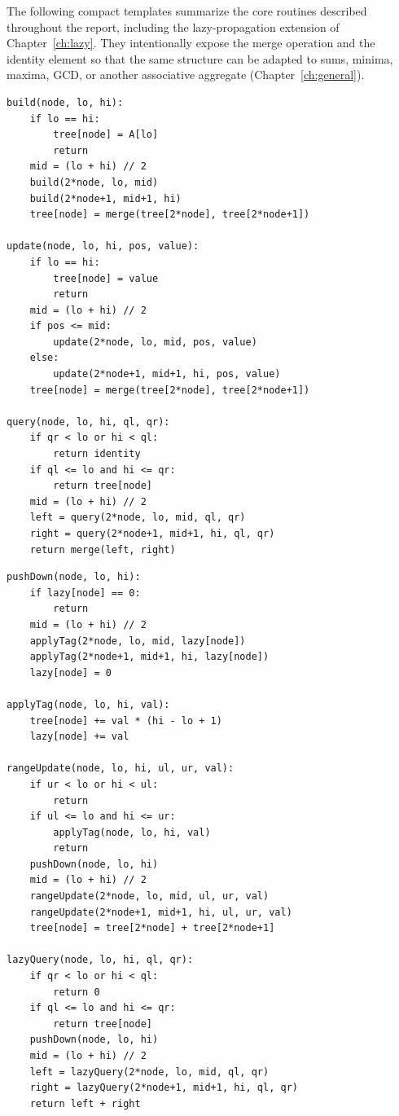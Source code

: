 \documentclass[
  11pt,
  a4paper,
  twoside=false,
  numbers=noenddot,
  headings=big,
  parskip=half,
  toc=bibliography,
  toc=listof,
  bibliography=totoc
]{scrreprt}
\begin{document}
The following compact templates summarize the core routines described throughout the report, including the lazy-propagation extension of Chapter~\ref{ch:lazy}. They intentionally expose the merge operation and the identity element so that the same structure can be adapted to sums, minima, maxima, GCD, or another associative aggregate (Chapter~\ref{ch:general}).

\begin{lstlisting}[caption={Core build, point-update, and range-query routines (no lazy propagation).}]
build(node, lo, hi):
    if lo == hi:
        tree[node] = A[lo]
        return
    mid = (lo + hi) // 2
    build(2*node, lo, mid)
    build(2*node+1, mid+1, hi)
    tree[node] = merge(tree[2*node], tree[2*node+1])

update(node, lo, hi, pos, value):
    if lo == hi:
        tree[node] = value
        return
    mid = (lo + hi) // 2
    if pos <= mid:
        update(2*node, lo, mid, pos, value)
    else:
        update(2*node+1, mid+1, hi, pos, value)
    tree[node] = merge(tree[2*node], tree[2*node+1])

query(node, lo, hi, ql, qr):
    if qr < lo or hi < ql:
        return identity
    if ql <= lo and hi <= qr:
        return tree[node]
    mid = (lo + hi) // 2
    left = query(2*node, lo, mid, ql, qr)
    right = query(2*node+1, mid+1, hi, ql, qr)
    return merge(left, right)
\end{lstlisting}

\begin{lstlisting}[caption={Lazy-propagation extension for range-add / range-sum (Chapter~\ref{ch:lazy}).}]
pushDown(node, lo, hi):
    if lazy[node] == 0:
        return
    mid = (lo + hi) // 2
    applyTag(2*node, lo, mid, lazy[node])
    applyTag(2*node+1, mid+1, hi, lazy[node])
    lazy[node] = 0

applyTag(node, lo, hi, val):
    tree[node] += val * (hi - lo + 1)
    lazy[node] += val

rangeUpdate(node, lo, hi, ul, ur, val):
    if ur < lo or hi < ul:
        return
    if ul <= lo and hi <= ur:
        applyTag(node, lo, hi, val)
        return
    pushDown(node, lo, hi)
    mid = (lo + hi) // 2
    rangeUpdate(2*node, lo, mid, ul, ur, val)
    rangeUpdate(2*node+1, mid+1, hi, ul, ur, val)
    tree[node] = tree[2*node] + tree[2*node+1]

lazyQuery(node, lo, hi, ql, qr):
    if qr < lo or hi < ql:
        return 0
    if ql <= lo and hi <= qr:
        return tree[node]
    pushDown(node, lo, hi)
    mid = (lo + hi) // 2
    left = lazyQuery(2*node, lo, mid, ql, qr)
    right = lazyQuery(2*node+1, mid+1, hi, ql, qr)
    return left + right
\end{lstlisting}
\end{document}
